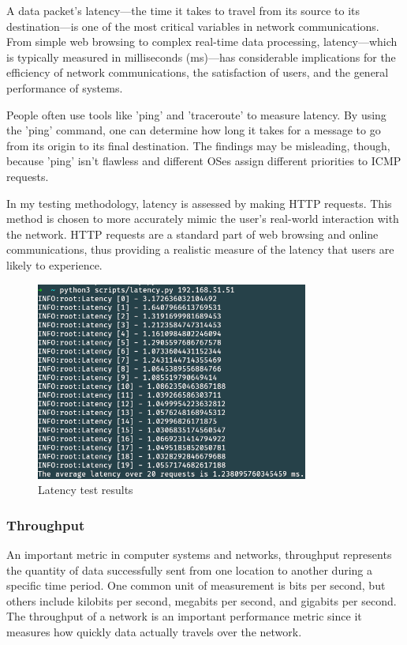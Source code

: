 \documentclass[12pt, fleqn, a4paper]{article}
\begin{document}
A data packet's latency—the time it takes to travel from its source to its destination—is one of the most critical variables in network communications. From simple web browsing to complex real-time data processing, latency—which is typically measured in milliseconds (ms)—has considerable implications for the efficiency of network communications, the satisfaction of users, and the general performance of systems.

People often use tools like 'ping' and 'traceroute' to measure latency. By using the 'ping' command, one can determine how long it takes for a message to go from its origin to its final destination. The findings may be misleading, though, because 'ping' isn't flawless and different OSes assign different priorities to ICMP requests. 

In my testing methodology, latency is assessed by making HTTP requests. This method is chosen to more accurately mimic the user's real-world interaction with the network. HTTP requests are a standard part of web browsing and online communications, thus providing a realistic measure of the latency that users are likely to experience.

\begin{figure}[H]
	\centering
	\includegraphics[width=0.8\textwidth]{img/latency}
	\caption{Latency test results}
  \label{fig:latency}
\end{figure}

\subsubsection{Throughput}
An important metric in computer systems and networks, throughput represents the quantity of data successfully sent from one location to another during a specific time period. One common unit of measurement is bits per second, but others include kilobits per second, megabits per second, and gigabits per second. The throughput of a network is an important performance metric since it measures how quickly data actually travels over the network.
\end{document}
